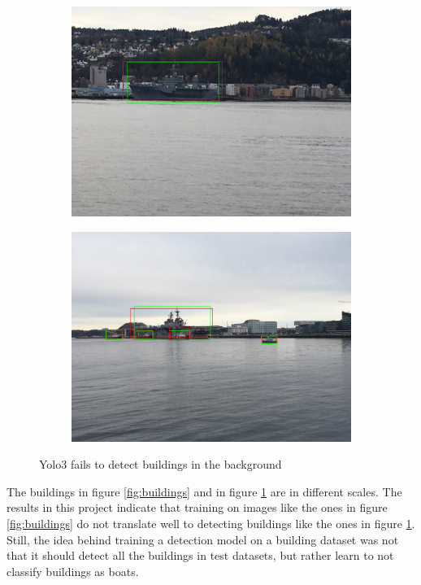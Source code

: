 \begin{figure}[h!]
\begin{subfigure}{.5\textwidth}
  \centering
  \includegraphics[width=0.8\linewidth]{discussion/yolo3_no_build/IMG_2673.jpg}
\end{subfigure}%
\begin{subfigure}{.5\textwidth}
  \centering
  \includegraphics[width=.8\linewidth]{discussion/yolo3_no_build/IMG_2695.jpg}
\end{subfigure}
\caption{Yolo3 fails to detect buildings in the background}
\label{fig:yolo3_no_build}
\end{figure}


The buildings in figure \ref{fig:buildings} and in figure \ref{fig:yolo3_no_build} are in different scales. The results in this project indicate that training on images like the ones in figure \ref{fig:buildings} do not translate well to detecting buildings like the ones in figure \ref{fig:yolo3_no_build}. Still, the idea behind training a detection model on a building dataset was not that it should detect all the buildings in test datasets, but rather learn to not classify buildings as boats. 

